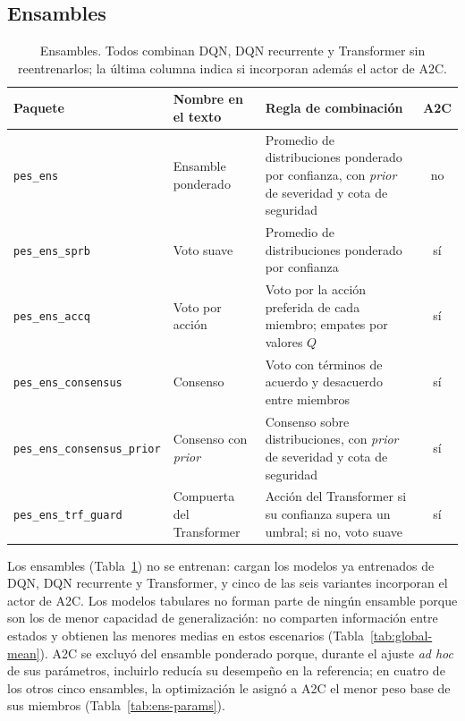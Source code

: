 \documentclass[../00_Main/Main.tex]{subfiles}
\begin{document}
\subsection{Ensambles}\label{sec:ens-methods}

\begin{table}[!htb]
\centering
\caption[Ensambles]{Ensambles. Todos combinan DQN, DQN recurrente y
Transformer sin reentrenarlos; la \'ultima columna indica si incorporan
adem\'as el actor de A2C.}
\label{tab:ens-packages}
\small
\begin{tabular}{@{}llp{4.5cm}c@{}}
\toprule
\textbf{Paquete} & \textbf{Nombre en el texto} & \textbf{Regla de combinaci\'on} & \textbf{A2C} \\
\midrule
\texttt{pes\_ens}                   & Ensamble ponderado        & Promedio de distribuciones ponderado por confianza, con \emph{prior} de severidad y cota de seguridad & no \\
\texttt{pes\_ens\_sprb}             & Voto suave                & Promedio de distribuciones ponderado por confianza & s\'i \\
\texttt{pes\_ens\_accq}             & Voto por acci\'on         & Voto por la acci\'on preferida de cada miembro; empates por valores $Q$ & s\'i \\
\texttt{pes\_ens\_consensus}        & Consenso                  & Voto con t\'erminos de acuerdo y desacuerdo entre miembros & s\'i \\
\texttt{pes\_ens\_consensus\_prior} & Consenso con \emph{prior} & Consenso sobre distribuciones, con \emph{prior} de severidad y cota de seguridad & s\'i \\
\texttt{pes\_ens\_trf\_guard}       & Compuerta del Transformer & Acci\'on del Transformer si su confianza supera un umbral; si no, voto suave & s\'i \\
\bottomrule
\end{tabular}
\end{table}

Los ensambles (Tabla~\ref{tab:ens-packages}) no se entrenan: cargan los modelos ya entrenados de DQN,
DQN recurrente y Transformer, y cinco de las seis variantes incorporan el
actor de A2C. Los modelos tabulares no forman parte de ning\'un ensamble
porque son los de menor capacidad de generalizaci\'on: no comparten
informaci\'on entre estados y obtienen las menores medias en estos
escenarios (Tabla~\ref{tab:global-mean}). A2C se excluy\'o del ensamble ponderado
porque, durante el ajuste \emph{ad hoc} de sus par\'ametros, incluirlo
reduc\'ia su desempe\~no en la referencia; en cuatro de los otros cinco
ensambles, la optimizaci\'on le asign\'o a A2C el menor peso base de sus
miembros (Tabla~\ref{tab:ens-params}).
\end{document}
